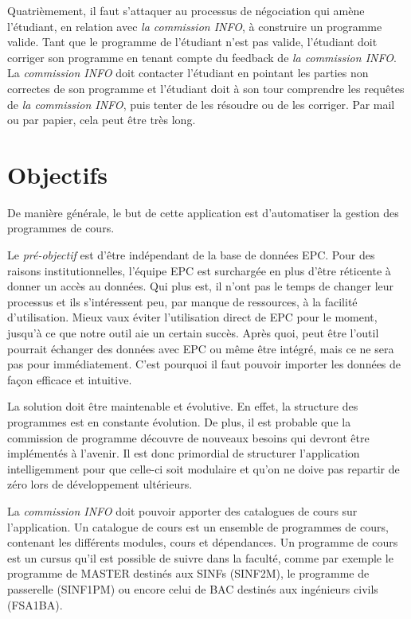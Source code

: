 Quatrièmement, il faut s'attaquer au processus de négociation qui amène l'étudiant, en relation avec \textit{la commission INFO}, à construire un programme valide. Tant que le programme de l'étudiant n'est pas valide, l'étudiant doit corriger son programme en tenant compte du feedback de \textit{la commission INFO}. La \textit{commission INFO} doit contacter l'étudiant en pointant les parties non correctes de son programme et l'étudiant doit à son tour comprendre les requêtes de \textit{la commission INFO}, puis tenter de les résoudre ou de les corriger. Par mail ou par papier, cela peut être très long. 
\clearpage


\section{Objectifs}
De manière générale, le but de cette application est d'automatiser la gestion des programmes de cours. 


Le \textit{pré-objectif} est d'être indépendant de la base de données EPC. Pour des raisons institutionnelles, l'équipe EPC est surchargée en plus d'être réticente à donner un accès au données. Qui plus est, il n'ont pas le temps de changer  leur processus et ils s'intéressent peu, par manque de ressources, à la facilité d'utilisation. Mieux vaux éviter l'utilisation direct de EPC pour le moment, jusqu'à ce que notre outil aie un certain succès. Après quoi, peut être l'outil pourrait échanger des données avec EPC ou même être intégré, mais ce ne sera pas pour immédiatement. C'est pourquoi il faut pouvoir importer les données de façon efficace et intuitive.
 
La solution doit être maintenable et évolutive. En effet, la structure des programmes est en constante évolution. De plus, il est probable que la commission de programme découvre de nouveaux besoins qui devront être implémentés à l'avenir. Il est donc primordial de structurer l'application intelligemment pour que celle-ci soit modulaire et qu'on ne doive pas repartir de zéro lors de développement ultérieurs.

La \textit{commission INFO} doit pouvoir apporter des catalogues de cours sur l'application. Un catalogue de cours est un ensemble de programmes de cours, contenant les différents modules, cours et dépendances. Un programme de cours est un cursus qu'il est possible de suivre dans la faculté, comme par exemple le programme de MASTER destinés aux SINFs (SINF2M), le programme de passerelle (SINF1PM) ou encore celui de BAC destinés aux ingénieurs civils (FSA1BA).  

